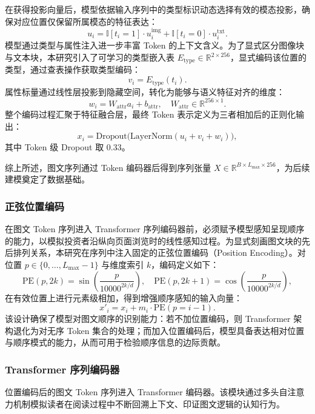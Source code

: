 在获得投影向量后，模型依据输入序列中的类型标识动态选择有效的模态投影，确保对应位置仅保留所属模态的特征表达：
\begin{equation}
u_i=\mathbb{I}[t_i=1]\cdot u_i^{\text{img}}+\mathbb{I}[t_i=0]\cdot u_i^{\text{txt}}.
\end{equation}
模型通过类型与属性注入进一步丰富 Token 的上下文含义。为了显式区分图像块与文本块，本研究引入了可学习的类型嵌入表 $ E_{\text{type}}\in\mathbb{R}^{2\times 256} $，显式编码该位置的类型，通过查表操作获取类型编码：
\begin{equation}
v_i=E_{\text{type}}(t_i).
\end{equation}
属性标量通过线性层投影到隐藏空间，转化为能够与语义特征对齐的维度：
\begin{equation}
w_i=W_{\text{attr}}a_i+b_{\text{attr}},\quad W_{\text{attr}}\in\mathbb{R}^{256\times 1}.
\end{equation}
整个编码过程汇聚于特征融合层，最终 Token 表示定义为三者相加后的正则化输出：
\begin{equation}
x_i=\text{Dropout}\big(\text{LayerNorm}(u_i+v_i+w_i)\big),
\end{equation}
其中 Token 级 Dropout 取 0.33。

综上所述，图文序列通过 Token 编码器后得到序列张量 $ X\in\mathbb{R}^{B\times L_{\max}\times 256} $，为后续建模奠定了数据基础。

\subsubsection{正弦位置编码}
在图文 Token 序列进入 Transformer 序列编码器前，必须赋予模型感知呈现顺序的能力，以模拟投资者沿纵向页面浏览时的线性感知过程。为显式刻画图文块的先后排列关系，本研究在序列中注入固定的正弦位置编码（Position Encoding）。对位置 $ p\in\{0,\ldots,L_{\max}-1\} $ 与维度索引 $ k $，编码定义如下：
\begin{equation}
\text{PE}(p,2k)=\sin\left(\frac{p}{10000^{2k/d}}\right),\quad
\text{PE}(p,2k+1)=\cos\left(\frac{p}{10000^{2k/d}}\right),
\end{equation}
在有效位置上进行元素级相加，得到增强顺序感知的输入向量：
\begin{equation}
x'_i=x_i+m_i\cdot \text{PE}(p=i-1).
\end{equation}
该设计确保了模型对图文顺序的识别能力：若不加位置编码，则 Transformer 架构退化为对无序 Token 集合的处理；而加入位置编码后，模型具备表达相对位置与顺序模式的能力，从而可用于检验顺序信息的边际贡献。

\subsubsection{Transformer 序列编码器}
位置编码后的图文 Token 序列进入 Transformer 编码器。该模块通过多头自注意力机制模拟读者在阅读过程中不断回溯上下文、印证图文逻辑的认知行为。

